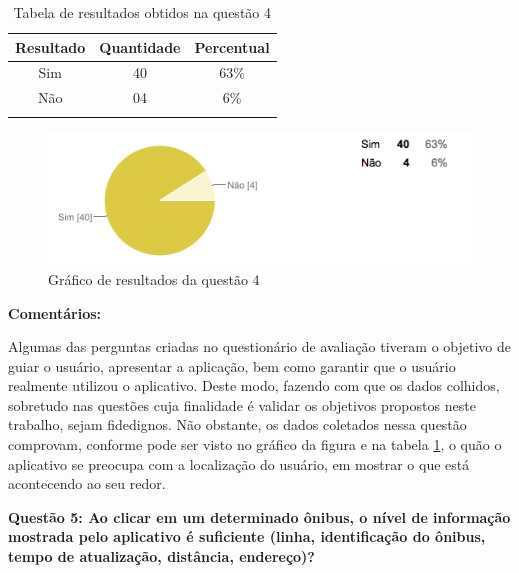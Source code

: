 \begin{center}
\begin{longtable}{c|c|c}
\hline
    \multicolumn{1}{c}{\textbf{Resultado}} & \multicolumn{1}{c}{\textbf{Quantidade}} & \multicolumn{1}{c}{\textbf{Percentual}} \\
\hline
    Sim & 40 &  63\%\\
    \hline
    Não & 04 & 6\%\\
    \hline
\caption{Tabela de resultados obtidos na questão 4}
\label{tabq4}
\end{longtable}
\end{center}


\begin{figure}[h]
\begin{center}
  \includegraphics[width=16cm]{images/graficos/questao4.png}
  \caption{Gráfico de resultados da questão 4}
  \label{fig:questao4}
\end{center}
\end{figure}

\textbf{Comentários:}

Algumas das perguntas criadas no questionário de avaliação tiveram o objetivo de guiar o usuário, apresentar a aplicação, bem como garantir que o usuário realmente utilizou o aplicativo. Deste modo, fazendo com que os dados colhidos, sobretudo nas questões cuja finalidade é validar os objetivos propostos neste trabalho, sejam fidedignos. Não obstante, os dados coletados nessa questão comprovam, conforme pode ser visto no gráfico da figura   e na tabela \ref{tabq4}, o quão o aplicativo se preocupa com a localização do usuário, em mostrar o que está acontecendo ao seu redor.\newline

\textbf{Questão 5: Ao clicar em um determinado ônibus, o nível de informação mostrada pelo aplicativo é suficiente (linha, identificação do ônibus, tempo de atualização, distância, endereço)?}

